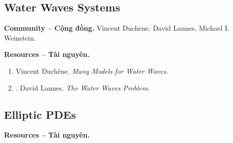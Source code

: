 \documentclass{article}
\begin{document}
\subsection{Water Waves Systems}
\textbf{\textsf{Community -- Cộng đồng.}} {\sc Vincent Duchene, David Lannes, Michael I. Weinstein}.

\noindent\textbf{\textsf{Resources -- Tài nguyên.}}
\begin{enumerate}
	\item {\sc Vincent Duch\^ene}. {\it Many Models for Water Waves}.
	\item \cite{Lannes2013}. {\sc David Lannes}. {\it The Water Waves Problem}.
\end{enumerate}

\subsection{Elliptic PDEs}
\textbf{\textsf{Resources -- Tài nguyên.}}
\end{document}
